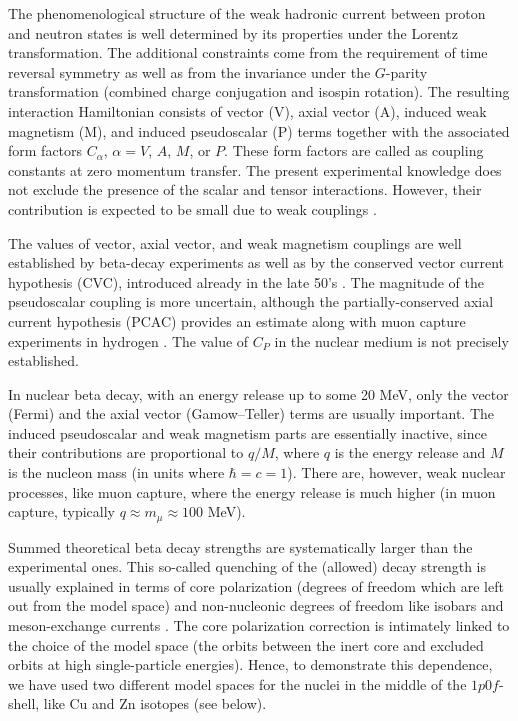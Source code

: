 The phenomenological structure of the weak hadronic current between 
proton and neutron states is well determined by its properties under the
Lorentz transformation. The additional constraints come from the
requirement of time reversal symmetry as well as from the invariance
under the $G$-parity transformation (combined charge conjugation and
isospin rotation). The resulting interaction Hamiltonian consists of
vector (V), axial vector (A), induced weak magnetism (M), and induced 
pseudoscalar (P) terms together with the associated form factors $C_\alpha$,
$\alpha=V$, $A$, $M$, or $P$. These form factors are called as coupling constants 
at zero momentum transfer. The present experimental knowledge does
not exclude the presence of the scalar and tensor interactions.
However, their contribution is expected to be small due to weak couplings 
\cite{gov98}.

The values of vector, axial vector, and weak magnetism couplings are
well established by beta-decay experiments as well as by the conserved
vector current hypothesis (CVC), introduced already in the late 50's
\cite{fey58}. The magnitude of the pseudoscalar coupling is more
uncertain, although the partially-conserved axial current hypothesis (PCAC)
\cite{gol58} provides an estimate along with muon capture experiments
in hydrogen \cite{bar81,wri98}. The value of $C_P$ in the nuclear medium is not
precisely established.

In nuclear beta decay, with an energy release up to some 20 MeV, only
the vector (Fermi) and the 
axial vector (Gamow--Teller) terms are usually important. 
The induced pseudoscalar and weak magnetism parts are essentially inactive,
since their contributions are proportional to $q/M$, where $q$ is the energy
release and $M$ is the nucleon mass (in units where $\hbar = c = 1$). 
There are, however, weak nuclear processes, like muon capture, where the
energy release is much higher (in muon capture, typically $q\approx m_\mu
\approx 100$ MeV).

Summed theoretical beta decay strengths are systematically larger than 
the experimental ones. This so-called quenching of the
(allowed) decay strength is usually explained in terms of core
polarization (degrees of freedom which are left out from the model space)
and non-nucleonic degrees of freedom like isobars and meson-exchange
currents \cite{tow87}. The core polarization 
correction is intimately linked to the choice of the model space (the orbits
between the inert core and excluded orbits at high single-particle energies).
Hence, to demonstrate this dependence, we have used two different model spaces
for the nuclei in the middle of the 
$1p0f$-shell, like Cu and Zn isotopes (see below).

